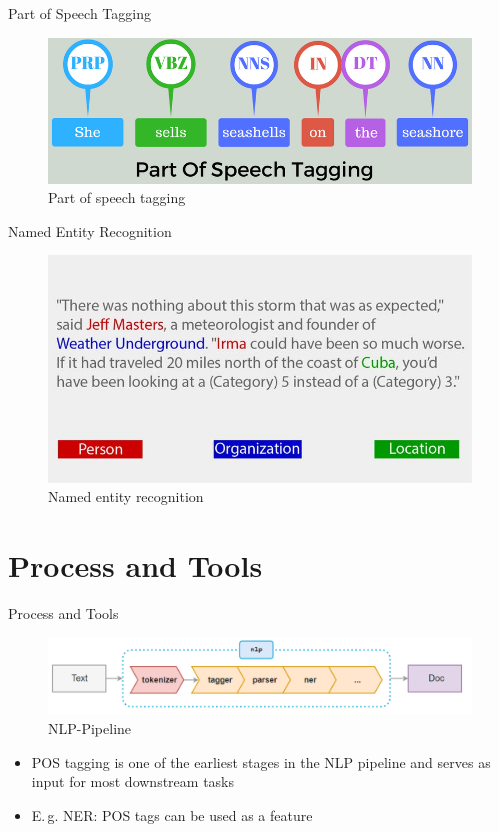 \begin{frame}{Part of Speech Tagging}{}
	\begin{figure}
		\includegraphics[scale=0.4]{img/pos_tagging}
		\caption{Part of speech tagging}
	\end{figure}
\end{frame}


\begin{frame}{Named Entity Recognition}{}
	\begin{figure}
		\includegraphics[scale=0.35]{img/ner}
		\caption{Named entity recognition}
	\end{figure}
\end{frame}

\section{Process and Tools}

\begin{frame}{Process and Tools}{}
	\begin{figure}
		\includegraphics[scale=0.4]{img/nlp_pipeline}
		\caption{NLP-Pipeline}
	\end{figure}

	\begin{itemize}
		\item POS tagging is one of the earliest stages in the NLP pipeline and serves as input for most
			downstream tasks
		\item E.\,g. NER: POS tags can be used as a feature 
	\end{itemize}
\end{frame}


